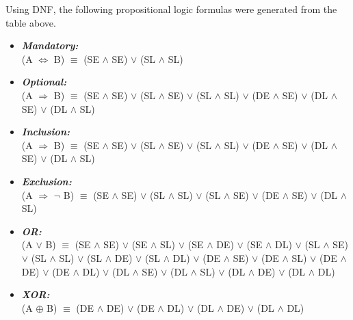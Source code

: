 \documentclass{article}
\begin{document}
Using DNF, the following propositional logic formulas were generated from the table above.

\begin{itemize}
	\item \textit{\textbf{Mandatory:}}\\ (A $ \Leftrightarrow $ B) $\equiv$ (SE $\wedge$ SE) $\vee$ (SL $\wedge$ SL)
	\item \textit{\textbf{Optional:}}\\ (A $ \Rightarrow $ B) $\equiv$ (SE $\wedge$ SE) $\vee$ (SL $\wedge$ SE) $\vee$ (SL $\wedge$ SL) $\vee$ (DE $\wedge$ SE) $\vee$ (DL $\wedge$ SE) $\vee$ (DL $\wedge$ SL)
	\item \textit{\textbf{Inclusion:}}\\ (A $ \Rightarrow $ B) $\equiv$ (SE $\wedge$ SE) $\vee$ (SL $\wedge$ SE) $\vee$ (SL $\wedge$ SL) $\vee$ (DE $\wedge$ SE) $\vee$ (DL $\wedge$ SE) $\vee$ (DL $\wedge$ SL)
	\item \textit{\textbf{Exclusion:}}\\ (A $ \Rightarrow $ $ \neg $ B) $\equiv$ (SE $\wedge$ SE) $\vee$ (SL $\wedge$ SL) $\vee$ (SL $\wedge$ SE) $\vee$ (DE $\wedge$ SE) $\vee$ (DL $\wedge$ SL)
	\item \textit{\textbf{OR:}}\\ (A $ \vee $ B) $\equiv$ (SE $\wedge$ SE) $\vee$ (SE $\wedge$ SL) $\vee$ (SE $\wedge$ DE) $\vee$ (SE $\wedge$ DL) $\vee$ (SL $\wedge$ SE) $\vee$ (SL $\wedge$ SL) $\vee$ (SL $\wedge$ DE) $\vee$ (SL $\wedge$ DL) $\vee$ (DE $\wedge$ SE) $\vee$ (DE $\wedge$ SL) $\vee$ (DE $\wedge$ DE) $\vee$ (DE $\wedge$ DL) $\vee$ (DL $\wedge$ SE) $\vee$ (DL $\wedge$ SL) $\vee$ (DL $\wedge$ DE) $\vee$ (DL $\wedge$ DL)
	\item \textit{\textbf{XOR:}}\\ (A $ \oplus $ B) $\equiv$ (DE $\wedge$ DE) $\vee$ (DE $\wedge$ DL) $\vee$ (DL $\wedge$ DE) $\vee$ (DL $\wedge$ DL)
\end{itemize}
\end{document}
